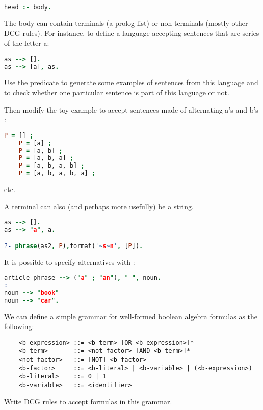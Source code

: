\documentclass{../../../tp}
\begin{document}
\begin{lstlisting}[language=prolog]
head :- body.
\end{lstlisting}

The body can contain terminals (a prolog list) or non-terminals (mostly other DCG rules). For instance, to define a language accepting sentences that are series of the letter a:

\begin{lstlisting}[language=prolog]
as --> [].
as --> [a], as.
\end{lstlisting}

\begin{instruction}
	Use the  predicate to generate some examples of sentences from this language and to check whether one particular sentence is part of this language or not.
	
	Then modify the toy example to accept sentences made of alternating a's and b's :
	\begin{lstlisting}[language=prolog]
	P = [] ;
	P = [a] ;
	P = [a, b] ;
	P = [a, b, a] ;
	P = [a, b, a, b] ;
	P = [a, b, a, b, a] ;
	\end{lstlisting}
	etc.
\end{instruction}

A terminal can also (and perhaps more usefully) be a string. 
\begin{lstlisting}[language=prolog]
as --> [].
as --> "a", a.

?- phrase(as2, P),format('~s~n', [P]).
\end{lstlisting}

It is possible to specify alternatives with \prologcode{;}:
\begin{lstlisting}[language=prolog]
article_phrase --> ("a" ; "an"), " ", noun.
:
noun --> "book"                                                            
noun --> "car".
\end{lstlisting}


\begin{instruction}
	We can define a simple grammar for well-formed boolean algebra formulas as the following:
	
	\begin{verbatim}
	<b-expression> ::= <b-term> [OR <b-expression>]*
	<b-term>       ::= <not-factor> [AND <b-term>]*
	<not-factor>   ::= [NOT] <b-factor>
	<b-factor>     ::= <b-literal> | <b-variable> | (<b-expression>)
	<b-literal>    ::= 0 | 1
	<b-variable>   ::= <identifier>
	\end{verbatim}
	
	Write DCG rules to accept formulas in this grammar. 
\end{instruction}
\end{document}
